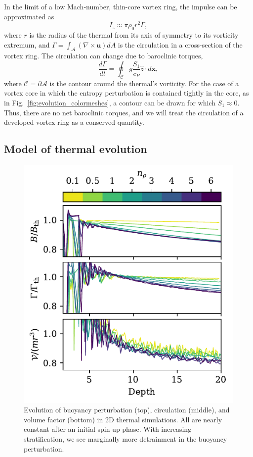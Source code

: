 \documentclass[twocolumn, amsmath, amsfonts, amssymb, trackchanges]{aastex62}
\newcommand{\grad}{\ensuremath{\nabla}}
\begin{document}
In the limit of a low Mach-number, thin-core vortex ring, the impulse can be approximated as
\begin{equation}
I_z \approx \pi \rho_0 r^2 \Gamma,
\label{eqn:impulse_approx}
\end{equation}
where $r$ is the radius of the thermal from its axis of symmetry to its vorticity extremum, and $\Gamma = \int_{\mathcal{A}} (\grad\times\bm{u})dA$ is the circulation in a cross-section of the vortex ring.
The circulation can change due to baroclinic torques,
\begin{equation}
\frac{d\Gamma}{dt} = \oint_{\mathcal{C}} g \frac{S_1}{c_P}\hat{z} \cdot d\bm{x},
\label{eqn:circulation}
\end{equation}
where $\mathcal{C}=\partial \mathcal{A}$ is the contour around the thermal's vorticity.
For the case of a vortex core in which the entropy perturbation is contained tightly in the core, as in Fig.~\ref{fig:evolution_colormeshes}, a contour can be drawn for which $S_1\approx0$.
Thus, there are no net baroclinic torques, and we will treat the circulation of a developed vortex ring as a conserved quantity.


\subsection{Model of thermal evolution}
\begin{figure}[t!]
    \includegraphics[width=\columnwidth]{constants.pdf}
    \caption{
	Evolution of buoyancy perturbation (top), circulation (middle), and volume factor (bottom) in 2D thermal simulations.
	All are nearly constant after an initial spin-up phase.
	With increasing stratification, we see marginally more detrainment in the buoyancy perturbation.
    \label{fig:constants} }
\end{figure}
\end{document}
